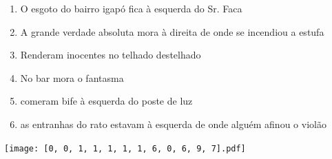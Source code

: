 \documentclass[12pt]{article}
\begin{document}
		 

\pagebreak


	\begin{enumerate}
		  \sffamily %
		  \large %


\vfill \item
O esgoto do bairro igapó fica	%
à esquerda
do Sr. Faca	%

\vfill \item
A grande verdade absoluta mora	%
à direita
de onde se incendiou a estufa	%

\vfill \item
Renderam inocentes	%
no telhado destelhado	%

\vfill \item
No bar	%
mora o fantasma	%

\vfill \item
comeram bife	%
à esquerda
do poste de luz	%

\vfill \item
as entranhas do rato estavam	%
à esquerda
de onde alguém afinou o violão	%
	\end{enumerate}
		  
		  \hfill

		  \vfill

\texttt{[image: [0, 0, 1, 1, 1, 1, 1, 6, 0, 6, 9, 7].pdf]}


	\hfill	  	  


\pagebreak			
\end{document}
